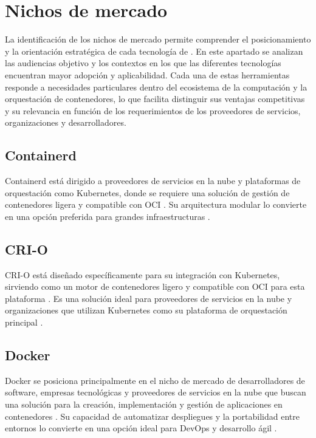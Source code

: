 \section{Nichos de mercado}\label{sec:nichos-mercado}
\noindent
La identificación de los nichos de mercado permite comprender el posicionamiento y la orientación estratégica de cada tecnología de \VBC. En este apartado se analizan las audiencias objetivo y los contextos en los que las diferentes tecnologías encuentran mayor adopción y aplicabilidad. Cada una de estas herramientas responde a necesidades particulares dentro del ecosistema de la computación y la orquestación de contenedores, lo que facilita distinguir sus ventajas competitivas y su relevancia en función de los requerimientos de los proveedores de servicios, organizaciones y desarrolladores.
\subsection{Containerd}
\noindent
Containerd está dirigido a proveedores de servicios en la nube y plataformas de orquestación como Kubernetes, donde se requiere una solución de gestión de contenedores ligera y compatible con OCI \citep{Vano2023}. Su arquitectura modular lo convierte en una opción preferida para grandes infraestructuras \citep{Zhou2021}.

\subsection{CRI-O}
\noindent
CRI-O está diseñado específicamente para su integración con Kubernetes, sirviendo como un motor de contenedores ligero y compatible con OCI para esta plataforma \citep{CNCF2019}. Es una solución ideal para proveedores de servicios en la nube y organizaciones que utilizan Kubernetes como su plataforma de orquestación principal \citep{151962df5f7e4b9faba0629540c11439}.

\subsection{Docker}
\noindent
Docker se posiciona principalmente en el nicho de mercado de desarrolladores de software, empresas tecnológicas y proveedores de servicios en la nube que buscan una solución para la creación, implementación y gestión de aplicaciones en contenedores \citep{Hill2025}. Su capacidad de automatizar despliegues y la portabilidad entre entornos lo convierte en una opción ideal para DevOps y desarrollo ágil \citep{Mag2025}.

